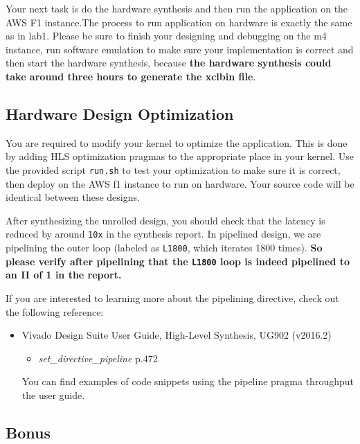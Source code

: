 \documentclass[paper=letter, fontsize=10pt]{scrartcl} %
\numberwithin{equation}{section} %
\numberwithin{figure}{section} %
\numberwithin{table}{section} %
\begin{document}
Your next task is do the hardware synthesis and then run the application on the AWS F1 instance.The process to run application on hardware is exactly the same as in lab1.
 Please be sure to finish your designing and debugging on the m4 instance, run software emulation to make sure your 
implementation is correct and then start the hardware synthesis, because \textbf{the hardware synthesis could take around three hours to generate the xclbin file}.


\subsection{Hardware Design Optimization}

You are required to modify your kernel to optimize the application. This is done by adding HLS optimization pragmas to the appropriate place in your kernel. 
Use the provided script \texttt{run.sh} to test your optimization to make sure it is correct, then deploy on the AWS f1 instance to run on hardware.
Your source code will be identical between these designs. 

After synthesizing the unrolled design, you should check that the latency is
reduced by around \texttt{10x} in the synthesis report. 
In pipelined design, we are pipelining the outer loop (labeled as \texttt{L1800}, which iterates 1800 times). 
\textbf{So please verify after pipelining that the \texttt{L1800} loop is indeed pipelined to an II of 1 in the report.}

If you are interested to learning more about the pipelining directive, check out the following reference:
\begin{itemize}
\item Vivado Design Suite User Guide, High-Level Synthesis, UG902 (v2016.2)~\cite{ug902}
\begin{itemize}
\item \textit{set\_directive\_pipeline} p.472
\end{itemize}
You can find examples of code snippets using the pipeline pragma throughput the user guide.
\end{itemize}

\subsection{Bonus}
\label{subsec:bonus}
\end{document}

